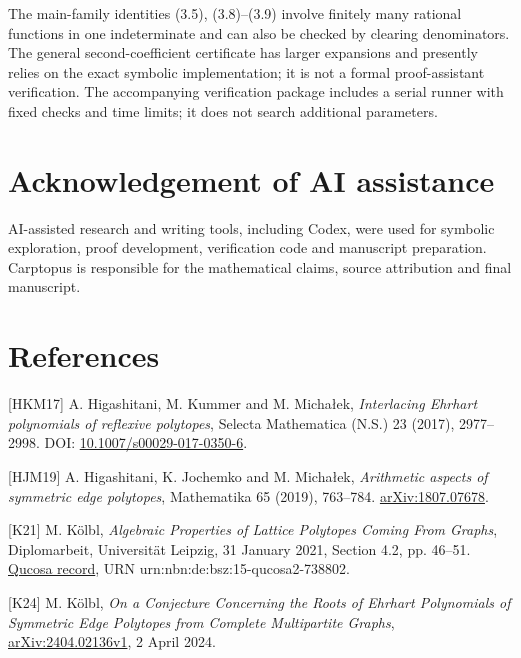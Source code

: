 \documentclass[11pt]{article}
\begin{document}
The main-family identities (3.5), (3.8)--(3.9) involve finitely many rational functions in one indeterminate and can also be checked by clearing denominators. The general second-coefficient certificate has larger expansions and presently relies on the exact symbolic implementation; it is not a formal proof-assistant verification. The accompanying verification package includes a serial runner with fixed checks and time limits; it does not search additional parameters.

\section*{Acknowledgement of AI assistance}

AI-assisted research and writing tools, including Codex, were used for symbolic exploration, proof development, verification code and manuscript preparation. Carptopus is responsible for the mathematical claims, source attribution and final manuscript.

\section*{References}

[HKM17] A. Higashitani, M. Kummer and M. Micha\l{}ek, \emph{Interlacing Ehrhart polynomials of reflexive polytopes}, Selecta Mathematica (N.S.) 23 (2017), 2977--2998. DOI: \href{https://doi.org/10.1007/s00029-017-0350-6}{10.1007/s00029-017-0350-6}.

[HJM19] A. Higashitani, K. Jochemko and M. Micha\l{}ek, \emph{Arithmetic aspects of symmetric edge polytopes}, Mathematika 65 (2019), 763--784. \href{https://arxiv.org/abs/1807.07678}{arXiv:1807.07678}.

[K21] M. Kölbl, \emph{Algebraic Properties of Lattice Polytopes Coming From Graphs}, Diplomarbeit, Universität Leipzig, 31 January 2021, Section 4.2, pp. 46--51. \href{https://ul.qucosa.de/landing-page/?tx_dlf\%5Bid\%5D=https\%3A\%2F\%2Ful.qucosa.de\%2Fapi\%2Fqucosa\%253A73880\%2Fmets}{Qucosa record}, URN urn:nbn:de:bsz:15-qucosa2-738802.

[K24] M. Kölbl, \emph{On a Conjecture Concerning the Roots of Ehrhart Polynomials of Symmetric Edge Polytopes from Complete Multipartite Graphs}, \href{https://arxiv.org/abs/2404.02136v1}{arXiv:2404.02136v1}, 2 April 2024.
\end{document}

